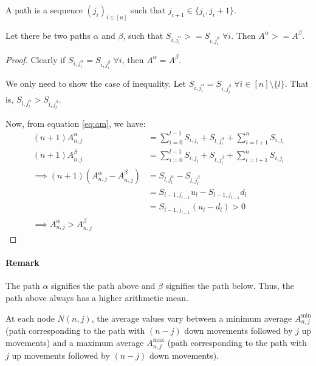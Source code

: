 \begin{defn}[Path]
  A path is a sequence $(j_i)_{i \in [n]}$ such that $j_{i+1} \in \{ j_i,j_i+1 \}$.
\end{defn}


\begin{thm}
  Let there be two paths $\alpha$ and $\beta$, such that $S_{i,j_i^\alpha} >= S_{i,j_i^\beta} \; \forall i$. Then $A^\alpha >= A^\beta$.
\end{thm}

\begin{proof}
  Clearly if $S_{i,j_i^\alpha} = S_{i,j_i^\beta} \; \forall i$, then $A^\alpha = A^\beta$.

  We only need to show the case of inequality.
  Let $S_{i,j_i^\alpha} = S_{i,j_i^\beta} \; \forall i \in [n] \setminus \{l\}$. That is, $S_{l,j_l^\alpha} > S_{l,j_l^\beta}$.

  Now, from equation \ref{eq:am}, we have:
  \begin{align*}
    (n+1) A_{n,j}^\alpha &= \sum_{i=0}^{l-1} S_{i,j_i} + S_{l,j_l^\alpha} + \sum_{i=l+1}^{n} S_{i,j_i} \\
    (n+1) A_{n,j}^\beta &= \sum_{i=0}^{l-1} S_{i,j_i} + S_{l,j_l^\beta} + \sum_{i=l+1}^{n} S_{i,j_i} \\
    \implies (n+1) \left(A_{n,j}^\alpha - A_{n,j}^\beta\right) &= S_{l,j_l^\alpha} - S_{l,j_l^\beta} \\
                         &= S_{l-1,j_{l-1}} u_l - S_{l-1,j_{l-1}} d_l \\
                         &= S_{l-1,j_{l-1}} (u_l - d_l) > 0 \\
    \implies A_{n,j}^\alpha > A_{n,j}^\beta
  \end{align*}

\end{proof}


\paragraph{Remark}
The path $\alpha$ signifies the path above and $\beta$ signifies the path below. Thus, the path above always has a higher arithmetic mean.


\begin{thm}
  At each node $N(n,j)$, the average values vary between a minimum average $A_{n,j}^{\mathrm{min}}$ (path corresponding to the path with $(n-j)$ down movements followed by $j$ up movements) and a maximum average $A_{n,j}^{\mathrm{max}}$ (path corresponding to the path with $j$ up movements followed by $(n-j)$ down movements).
\end{thm}


